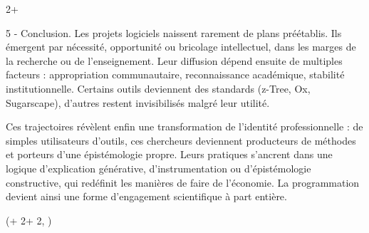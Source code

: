 \documentclass{beamer}
\newlength{\blockFour}
\begin{document}
\begin{frame}[t]
\begin{textblock*}{2\colwidth + \colsep}
\begin{alertblock}{5 - Conclusion.}
	Les projets logiciels naissent rarement de plans préétablis. Ils émergent par nécessité, opportunité ou bricolage intellectuel, dans les marges de la recherche ou de l’enseignement. Leur diffusion dépend ensuite de multiples facteurs : appropriation communautaire, reconnaissance académique, stabilité institutionnelle. Certains outils deviennent des standards (z-Tree, Ox, Sugarscape), d'autres restent invisibilisés malgré leur utilité.

	Ces trajectoires révèlent enfin une transformation de l’identité professionnelle : de simples utilisateurs d’outils, ces chercheurs deviennent producteurs de méthodes et porteurs d’une épistémologie propre. Leurs pratiques s’ancrent dans une logique d’explication générative, d'instrumentation ou d'épistémologie constructive, qui redéfinit les manières de faire de l’économie. La programmation devient ainsi une forme d’engagement scientifique à part entière.

	\vspace{0.25cm}
	\end{alertblock}

\end{textblock*}





\begin{textblock*}{\colwidth}(\leftmargin + 2\colwidth + 2\colsep, \blockFour)

\begin{parblock}{\textmd{\refname}}
	\vspace{-1.333333\baselineskip}  %
	\setlength{\bibhang}{0pt}
	\setlength{\bibsep}{0\baselineskip}
	\renewcommand*{\bibfont}{\sffamily\small\setlength{\baselineskip}{28.8pt}}
	\renewcommand*{\bf}{\bfseries}
	\begin{refcontext}[sorting = nyt]
	\printbibliography[heading = none]
	\end{refcontext}

\end{parblock}

\end{textblock*}


\end{frame}
\end{document}
